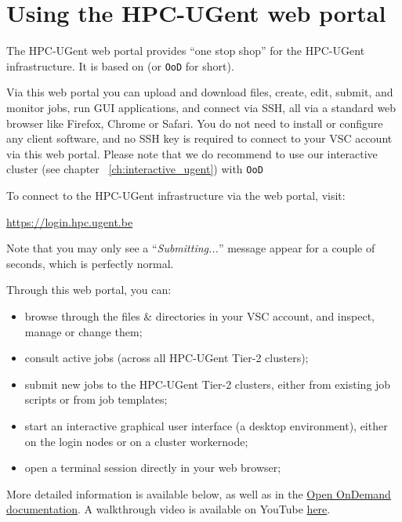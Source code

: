 \chapter{Using the HPC-UGent web portal}
\label{ch:web_portal}

The HPC-UGent web portal provides ``one stop shop'' for the HPC-UGent infrastructure.
It is based on \href{https://openondemand.org/}{} (or \texttt{OoD} for short).

Via this web portal you can upload and download files, create, edit, submit, and monitor jobs,
run GUI applications, and connect via SSH, all via a standard web browser like Firefox, Chrome
or Safari. You do not need to install or configure any client software,
and no SSH key is required to connect to your VSC account via this web portal.
Please note that we do recommend to use our interactive cluster
(see chapter ~\ref{ch:interactive_ugent}) with \texttt{OoD}

To connect to the HPC-UGent infrastructure via the web portal, visit:

\begin{center}\url{https://login.hpc.ugent.be}\end{center}

Note that you may only see a ``\emph{Submitting...}'' message appear for a couple of seconds,
which is perfectly normal.

Through this web portal, you can:
\begin{itemize}
    \item browse through the files \& directories in your VSC account, and inspect, manage or change them;
    \item consult active jobs (across all HPC-UGent Tier-2 clusters);
    \item submit new jobs to the HPC-UGent Tier-2 clusters, either from existing job scripts or from job templates;
    \item start an interactive graphical user interface (a desktop environment), either on the login nodes or on a cluster workernode;
    \item open a terminal session directly in your web browser;
\end{itemize}

More detailed information is available below, as well as in the \href{https://osc.github.io/ood-documentation/master/}{Open OnDemand documentation}.
A walkthrough video is available on YouTube \href{https://www.youtube.com/watch?v=4-w-4wjlnPk}{here}.

